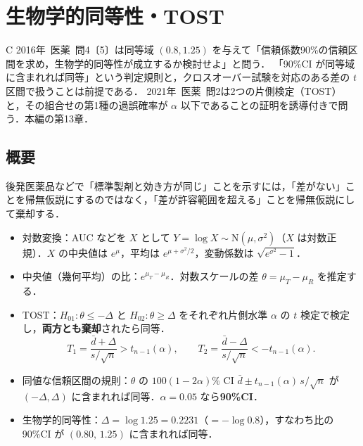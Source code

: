 \documentclass[a4paper,11pt,openany]{ltjsbook}
\newcommand{\kakomon}[2]{\mbox{#1年 医薬 問#2}}
\newcommand{\Normal}{\mathrm{N}}
\begin{document}
\chapter{生物学的同等性・TOST}\label{ch:m10}

\begin{priobox}{C}
\kakomon{2016}{4}〔5〕は同等域 $(0.8,1.25)$ を与えて「信頼係数90\%の信頼区間を求め，生物学的同等性が成立するか検討せよ」と問う．
「90\%CI が同等域に含まれれば同等」という判定規則と，クロスオーバー試験を対応のある差の $t$ 区間で扱うことは前提である．
\kakomon{2021}{2}は2つの片側検定（TOST）と，その組合せの第1種の過誤確率が $\alpha$ 以下であることの証明を誘導付きで問う．本編の第13章．
\end{priobox}

\section{概要}\label{sec:m10-gaiyo}
後発医薬品などで「標準製剤と効き方が同じ」ことを示すには，「差がない」ことを帰無仮説にするのではなく，「差が許容範囲を超える」ことを帰無仮説にして棄却する．
\begin{pointbox}[覚える式]
\begin{itemize}
\item 対数変換：AUC などを $X$ として $Y=\log X\sim\Normal(\mu,\sigma^2)$（$X$ は対数正規）．$X$ の中央値は $e^\mu$，平均は $e^{\mu+\sigma^2/2}$，変動係数は $\sqrt{e^{\sigma^2}-1}$．
\item 中央値（幾何平均）の比：$e^{\mu_T-\mu_R}$．対数スケールの差 $\theta=\mu_T-\mu_R$ を推定する．
\item TOST：$H_{01}:\theta\le-\Delta$ と $H_{02}:\theta\ge\Delta$ をそれぞれ片側水準 $\alpha$ の $t$ 検定で検定し，\textbf{両方とも棄却}されたら同等．
      \[T_1=\frac{\bar d+\Delta}{s/\sqrt n}>t_{n-1}(\alpha),\qquad T_2=\frac{\bar d-\Delta}{s/\sqrt n}<-t_{n-1}(\alpha).\]
\item 同値な信頼区間の規則：$\theta$ の $100(1-2\alpha)\%$ CI $\bar d\pm t_{n-1}(\alpha)\,s/\sqrt n$ が $(-\Delta,\Delta)$ に含まれれば同等．$\alpha=0.05$ なら\textbf{90\%CI}．
\item 生物学的同等性：$\Delta=\log1.25=0.2231$（$=-\log0.8$），すなわち比の90\%CI が $(0.80,\,1.25)$ に含まれれば同等．
\end{itemize}
\end{pointbox}

\end{document}

